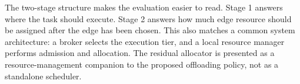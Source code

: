 The two-stage structure makes the evaluation easier to read. Stage 1 answers where the task should execute. Stage 2 answers how much edge resource should be assigned after the edge has been chosen. This also matches a common system architecture: a broker selects the execution tier, and a local resource manager performs admission and allocation. The residual allocator is presented as a resource-management companion to the proposed offloading policy, not as a standalone scheduler.
